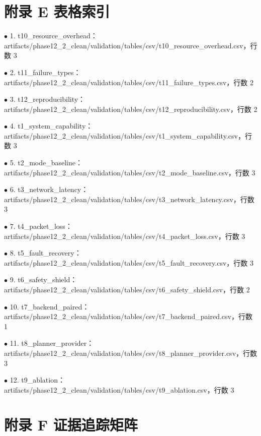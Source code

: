 \section{附录 E 表格索引}

\noindent $\bullet$ 1. t10\_resource\_overhead：artifacts/phase12\_2\_clean/validation/tables/csv/t10\_resource\_overhead.csv，行数 3\par
\noindent $\bullet$ 2. t11\_failure\_types：artifacts/phase12\_2\_clean/validation/tables/csv/t11\_failure\_types.csv，行数 2\par
\noindent $\bullet$ 3. t12\_reproducibility：artifacts/phase12\_2\_clean/validation/tables/csv/t12\_reproducibility.csv，行数 2\par
\noindent $\bullet$ 4. t1\_system\_capability：artifacts/phase12\_2\_clean/validation/tables/csv/t1\_system\_capability.csv，行数 3\par
\noindent $\bullet$ 5. t2\_mode\_baseline：artifacts/phase12\_2\_clean/validation/tables/csv/t2\_mode\_baseline.csv，行数 3\par
\noindent $\bullet$ 6. t3\_network\_latency：artifacts/phase12\_2\_clean/validation/tables/csv/t3\_network\_latency.csv，行数 3\par
\noindent $\bullet$ 7. t4\_packet\_loss：artifacts/phase12\_2\_clean/validation/tables/csv/t4\_packet\_loss.csv，行数 3\par
\noindent $\bullet$ 8. t5\_fault\_recovery：artifacts/phase12\_2\_clean/validation/tables/csv/t5\_fault\_recovery.csv，行数 3\par
\noindent $\bullet$ 9. t6\_safety\_shield：artifacts/phase12\_2\_clean/validation/tables/csv/t6\_safety\_shield.csv，行数 2\par
\noindent $\bullet$ 10. t7\_backend\_paired：artifacts/phase12\_2\_clean/validation/tables/csv/t7\_backend\_paired.csv，行数 1\par
\noindent $\bullet$ 11. t8\_planner\_provider：artifacts/phase12\_2\_clean/validation/tables/csv/t8\_planner\_provider.csv，行数 3\par
\noindent $\bullet$ 12. t9\_ablation：artifacts/phase12\_2\_clean/validation/tables/csv/t9\_ablation.csv，行数 3\par

\section{附录 F 证据追踪矩阵}

